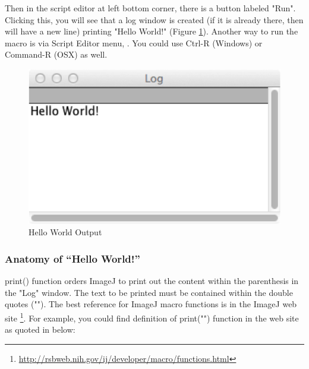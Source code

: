 Then in the script editor at left bottom corner, there is a button labeled "Run". Clicking this, you will see that a log window is created (if it is already there, then will have a new line) printing "Hello World!" (Figure \ref{fig_HelloWorldLog}). Another way to run the macro is via Script Editor menu,   . You could use Ctrl-R (Windows) or Command-R (OSX) as well.  

\begin{figure}[hbtp]
\begin{center}
\includegraphics[scale=1.0]{fig/helloworld_logwindow.png}
\caption{Hello World Output} \label{fig_HelloWorldLog}
\end{center}
\end{figure}

\subsubsection{Anatomy of ``Hello World!''}

print() function orders ImageJ to print out the content within the parenthesis 
in the "Log" window. The text to be printed must be contained within the double quotes (""). 
The best reference for ImageJ macro functions is in the ImageJ web site
\footnote{\url{http://rsbweb.nih.gov/ij/developer/macro/functions.html}}. 
For example, you could find definition of print("") function in the web site as quoted in below:\\
\begin{indentCom}
\end{indentCom}


